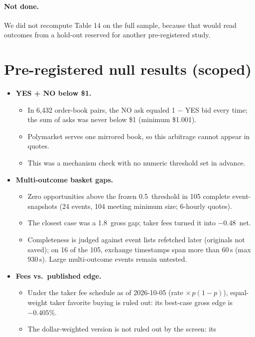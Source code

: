 \documentclass[10pt]{article}
\begin{document}
\paragraph{Not done.} We did not recompute Table 14 on the full sample, because
that would read outcomes from a hold-out reserved for another pre-registered
study.

\section{Pre-registered null results (scoped)}

\begin{itemize}
  \item \textbf{YES + NO below \$1.}
    \begin{itemize}[nosep]
      \item In 6,432 order-book pairs, the NO ask equaled 1 $-$ YES bid every
            time; the sum of asks was never below \$1 (minimum \$1.001).
      \item Polymarket serves one mirrored book, so this arbitrage cannot
            appear in quotes.
      \item This was a mechanism check with no numeric threshold set in advance.
    \end{itemize}
  \item \textbf{Multi-outcome basket gaps.}
    \begin{itemize}[nosep]
      \item Zero opportunities above the frozen 0.5\textcent\ threshold in 105
            complete event-snapshots (24 events, 104 meeting minimum size; 6-hourly quotes).
      \item The closest case was a 1.8\textcent\ gross gap; taker fees turned it
            into $-0.48$\textcent\ net.
      \item Completeness is judged against event lists refetched later
            (originals not saved); on 16 of the 105, exchange timestamps span
            more than 60\,s (max 930\,s). Large multi-outcome events remain
            untested.
    \end{itemize}
  \item \textbf{Fees vs.\ published edge.}
    \begin{itemize}[nosep]
      \item Under the taker fee schedule as of 2026-10-05 (rate $\times\,p(1-p)$), equal-weight
            taker favorite buying is ruled out: its best-case gross edge is
            $-0.405\%$.
      \item The dollar-weighted version is not ruled out by the screen: its

\end{itemize}
\end{itemize}
\end{document}
